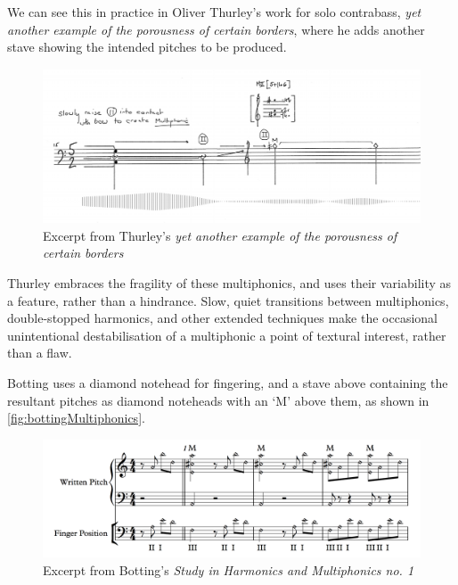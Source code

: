 We can see this in practice in Oliver Thurley's work for solo contrabass, \emph{yet another example of the porousness of certain borders}, where he adds another stave showing the intended pitches to be produced.\autocite{thurleyAnotherExamplePorousness2014}

  \begin{figure}
    \centering
    \includegraphics[width=\linewidth]{./resources/thurleyMultiphonicNotation.png}
    \caption{Excerpt from Thurley's \emph{yet another example of the porousness of certain borders}}\label{fig:Excerpt from Thurley's `yet another example of the porousness of certain borders'}\end{figure}

Thurley embraces the fragility of these multiphonics, and uses their variability as a feature, rather than a hindrance. 
Slow, quiet transitions between multiphonics, double-stopped harmonics, and other extended techniques make the occasional unintentional destabilisation of a multiphonic a point of textural interest, rather than a flaw.

Botting uses a diamond notehead for fingering, and a stave above containing the resultant pitches as diamond noteheads with an `M' above them, as shown in \autoref{fig:bottingMultiphonics}.\autocite[35]{bottingDevelopingPersonalVocabulary2019}

\begin{figure}
  \centering
  \includegraphics[width=\linewidth]{./resources/bottingEtudeExample.png}
  \caption{Excerpt from Botting's \emph{Study in Harmonics and Multiphonics no. 1}}\label{fig:bottingMultiphonics}\end{figure}

